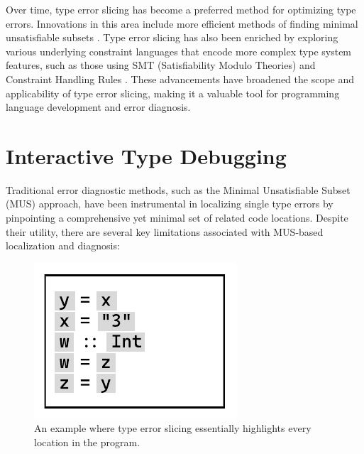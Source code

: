 Over time, type error slicing has become a preferred method for optimizing type errors. Innovations in this area include more efficient methods of finding minimal unsatisfiable subsets \cite{Liffiton2008-mx, Bailey2005-hi, Bacchus2015-of}. Type error slicing has also been enriched by exploring various underlying constraint languages that encode more complex type system features, such as those using SMT (Satisfiability Modulo Theories) \cite{Pavlinovic2015-ke} and Constraint Handling Rules \cite{Stuckey2003-pz}. These advancements have broadened the scope and applicability of type error slicing, making it a valuable tool for programming language development and error diagnosis.


\section{Interactive Type Debugging}

Traditional error diagnostic methods, such as the Minimal Unsatisfiable Subset (MUS) approach, have been instrumental in localizing single type errors by pinpointing a comprehensive yet minimal set of related code locations. Despite their utility, there are several key limitations associated with MUS-based localization and diagnosis:

\begin{figure}[hbt]
  \includegraphics[width=0.5\linewidth]{SlicingCounterExample}
  \caption{
    \label{fig:slicing-counter-example}
      An example where type error slicing essentially highlights every location in the program.}
\end{figure}

